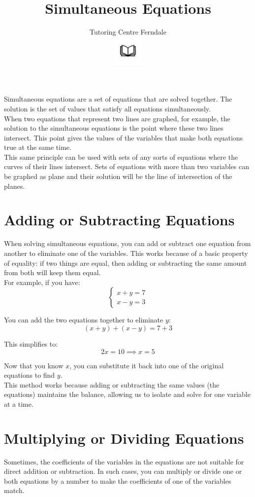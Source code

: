 \documentclass[12pt]{article}
\title{Simultaneous Equations}\\
\author{Tutoring Centre Ferndale\\
\includegraphics[width=4em]{ApS_logo.png}}
\date{}
\begin{document}
\maketitle

Simultaneous equations are a set of equations that are solved together. The solution is the set of values that satisfy all equations simultaneously.\\

When two equations that represent two lines are graphed, for example, the solution to the simultaneous equations is the point where these two lines intersect. This point gives the values of the variables that make both equations true at the same time.\\

This same principle can be used with sets of any sorts of equations where the curves of their lines intersect. Sets of equations with more than two variables can be graphed as plane and their solution will be the line of intersection of the planes.

\section*{Adding or Subtracting Equations}
When solving simultaneous equations, you can add or subtract one equation from another to eliminate one of the variables. This works because of a basic property of equality: if two things are equal, then adding or subtracting the same amount from both will keep them equal.\\

For example, if you have:
\[
\begin{cases}
x + y = 7 \\
x - y = 3
\end{cases}
\]

You can add the two equations together to eliminate \( y \):
\[
(x + y) + (x - y) = 7 + 3
\]

This simplifies to:
\[
2x = 10 \implies x = 5
\]

Now that you know \( x \), you can substitute it back into one of the original equations to find \( y \).\\

This method works because adding or subtracting the same values (the equations) maintains the balance, allowing us to isolate and solve for one variable at a time.

\section*{Multiplying or Dividing Equations}
Sometimes, the coefficients of the variables in the equations are not suitable for direct addition or subtraction. In such cases, you can multiply or divide one or both equations by a number to make the coefficients of one of the variables match.\\
\end{document}
